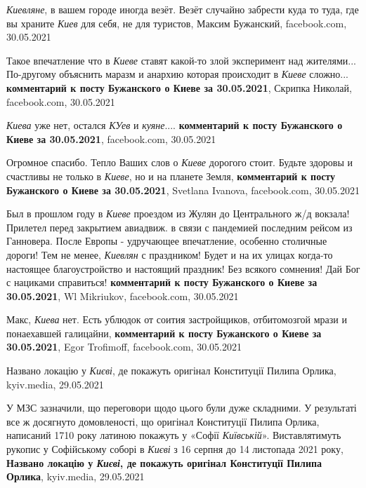 \emph{Киевляне}, в вашем городе иногда везёт.  Везёт случайно забрести куда то
туда, где вы храните \emph{Киев} для себя, не для туристов, Максим Бужанский,
facebook.com, 30.05.2021

Такое впечатление что в \emph{Киеве} ставят какой-то злой эксперимент над
жителями...  По-другому объяснить маразм и анархию которая происходит в
\emph{Киеве} сложно...  \textbf{комментарий к посту Бужанского о Киеве за
30.05.2021}, Скрипка Николай, facebook.com, 30.05.2021

\emph{Киева} уже нет, остался \emph{КУев} и \emph{куяне}....
\textbf{комментарий к посту Бужанского о Киеве за 30.05.2021}, facebook.com,
30.05.2021

Огромное спасибо. Тепло Ваших слов о \emph{Киеве} дорогого стоит. Будьте
здоровы и счастливы не только в \emph{Киеве}, но и на планете Земля,
\textbf{комментарий к посту Бужанского о Киеве за 30.05.2021}, Svetlana
Ivanova, facebook.com, 30.05.2021

Был в прошлом году в \emph{Киеве} проездом из Жулян до Центрального ж/д
вокзала!  Прилетел перед закрытием авиадвиж. в связи с пандемией последним
рейсом из Ганновера. После Европы - удручающее впечатление, особенно столичные
дороги!  Тем не менее, \emph{Киевлян} с праздником! Будет и на их улицах
когда-то настоящее благоустройство и настоящий праздник!  Без всякого сомнения!
Дай Бог с нациками справиться! \textbf{комментарий к посту Бужанского о Киеве
за 30.05.2021}, Wl Mikriukov, facebook.com, 30.05.2021

Макс, \emph{Киева} нет. Есть ублюдок от соития застройщиков, отбитомозгой мрази
и понаехавшей галицайни, \textbf{комментарий к посту Бужанского о Киеве за
30.05.2021}, Egor Trofimoff, facebook.com, 30.05.2021

Названо локацію у \emph{Києві}, де покажуть оригінал Конституції Пилипа Орлика,
kyiv.media, 29.05.2021

У МЗС зазначили, що переговори щодо цього були дуже складними. У результаті все
ж досягнуто домовленості, що оригінал Конституції Пилипа Орлика, написаний 1710
року латиною покажуть у «Софії \emph{Київській}».  Виставлятимуть рукопис  у
Софійському соборі в \emph{Києві} з 16 серпня до 14 листопада 2021 року,
\textbf{Названо локацію у \emph{Києві}, де покажуть оригінал Конституції Пилипа
Орлика}, kyiv.media, 29.05.2021
